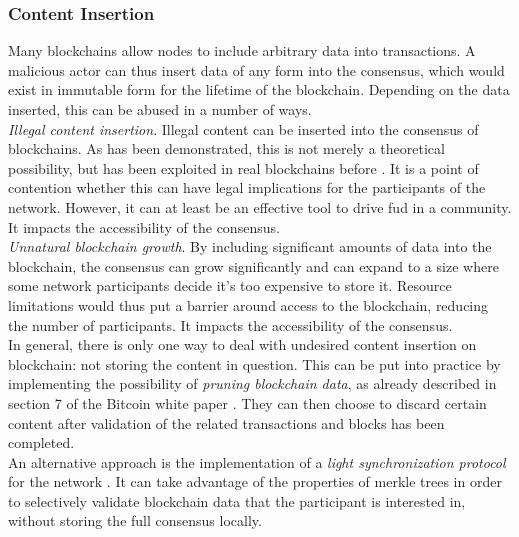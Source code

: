 \documentclass[12pt,a4paper]{article}
\begin{document}
\subsubsection{Content Insertion}

Many \glspl{blockchain} allow \glspl{node} to include arbitrary data into \glspl{transaction}. A malicious actor can thus insert data of any form into the \gls{consensus}, which would exist in immutable form for the lifetime of the \gls{blockchain}. Depending on the data inserted, this can be abused in a number of ways.\\

\textit{Illegal content insertion}. Illegal content can be inserted into the \gls{consensus} of \glspl{blockchain}. As has been demonstrated, this is not merely a theoretical possibility, but has been exploited in real \glspl{blockchain} before \cite{content}. It is a point of contention whether this can have legal implications for the participants of the network. However, it can at least be an effective tool to drive \acrfull{fud} in a community. It impacts the accessibility of the \gls{consensus}.\\

\textit{Unnatural blockchain growth}. By including significant amounts of data into the blockchain, the \gls{consensus} can grow significantly and can expand to a size where some network participants decide it's too expensive to store it. Resource limitations would thus put a barrier around access to the \gls{blockchain}, reducing the number of participants. It impacts the accessibility of the \gls{consensus}.\\

In general, there is only one way to deal with undesired content insertion on \gls{blockchain}: not storing the content in question. This can be put into practice by implementing the possibility of \textit{pruning blockchain data}, as already described in section 7 of the Bitcoin white paper \cite{bitcoin}. They can then choose to discard certain content after validation of the related \glspl{transaction} and \glspl{block} has been completed.\\

An alternative approach is the implementation of a \textit{light synchronization protocol} for the network \cite{light}. It can take advantage of the properties of merkle trees in order to selectively validate blockchain data that the participant is interested in, without storing the full \gls{consensus} locally.\\
\end{document}
